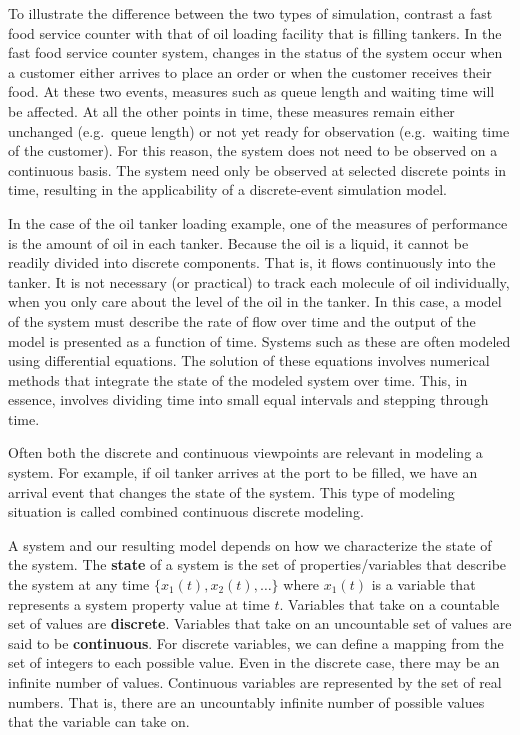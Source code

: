 \documentclass[
]{book}
\theoremstyle{definition}
\theoremstyle{definition}
\theoremstyle{definition}
\theoremstyle{definition}
\theoremstyle{remark}
\begin{document}
To illustrate the difference between the two types of simulation,
contrast a fast food service counter with that of oil loading facility
that is filling tankers. In the fast food service counter system,
changes in the status of the system occur when a customer either arrives
to place an order or when the customer receives their food. At these two
events, measures such as queue length and waiting time will be affected.
At all the other points in time, these measures remain either unchanged
(e.g.~queue length) or not yet ready for observation (e.g.~waiting time
of the customer). For this reason, the system does not need to be
observed on a continuous basis. The system need only be observed at
selected discrete points in time, resulting in the applicability of a
discrete-event simulation model.

In the case of the oil tanker loading example, one of the measures of
performance is the amount of oil in each tanker. Because the oil is a
liquid, it cannot be readily divided into discrete components. That is,
it flows continuously into the tanker. It is not necessary (or
practical) to track each molecule of oil individually, when you only
care about the level of the oil in the tanker. In this case, a model of
the system must describe the rate of flow over time and the output of
the model is presented as a function of time. Systems such as these are
often modeled using differential equations. The solution of these
equations involves numerical methods that integrate the state of the
modeled system over time. This, in essence, involves dividing time into
small equal intervals and stepping through time.

Often both the discrete and continuous viewpoints are relevant in
modeling a system. For example, if oil tanker arrives at the port to be
filled, we have an arrival event that changes the state of the system.
This type of modeling situation is called combined continuous discrete
modeling.

A system and our resulting model depends on how we characterize the state of the system. The \textbf{state} of a system is the set of properties/variables that
describe the system at any time \(\{x_1(t), x_2(t), \dots\}\) where \(x_1(t)\) is a
variable that represents a system property value at time \(t\). Variables that take
on a countable set of values are \textbf{discrete}. Variables that take on an
uncountable set of values are said to be \textbf{continuous}. For discrete
variables, we can define a mapping from the set of integers to each
possible value. Even in the discrete case, there may be an infinite number of values. Continuous
variables are represented by the set of real numbers. That is, there are
an uncountably infinite number of possible values that the variable can take on.
\end{document}
